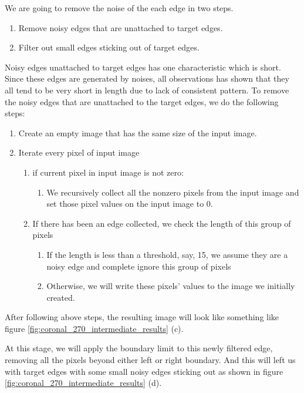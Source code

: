 We are going to remove the noise of the each edge in two steps. 
\begin{enumerate}
  \item Remove noisy edges that are unattached to target edges.
  \item Filter out small edges sticking out of target edges. 
\end{enumerate}

Noisy edges unattached to target edges has one characteristic which is short. Since these edges are generated
by noises, all observations has shown that they all tend to be very short in length due to lack of consistent
pattern. To remove the noisy edges that are unattached to the target edges, we do the following steps:
\begin{enumerate}
  \item Create an empty image that has the same size of the input image.
  \item Iterate every pixel of input image
    \begin{enumerate}
      \item if current pixel in input image is not zero:
        \begin{enumerate}
          \item We recursively collect all the nonzero pixels from the input image and set those pixel values on
            the input image to 0.
        \end{enumerate}
      \item If there has been an edge collected, we check the length of this group of pixels
        \begin{enumerate}
          \item If the length is less than a threshold, say, 15, we assume they are a noisy edge and 
            complete ignore this group of pixels
          \item Otherwise, we will write these pixels' values to the image we initially created.
        \end{enumerate}
    \end{enumerate}
\end{enumerate}

After following above steps, the resulting image will look like something like figure 
\ref{fig:coronal_270_intermediate_results} (c).

At this stage, we will apply the boundary limit to this newly filtered edge, removing all the pixels beyond
either left or right boundary. And this will left us with target edges with some small noisy edges sticking
out as shown in figure \ref{fig:coronal_270_intermediate_results} (d).

